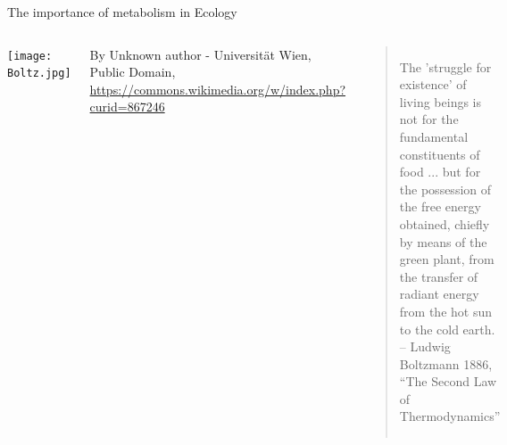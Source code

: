 \begin{frame}{The importance of metabolism in Ecology}

\begin{columns}[c]
  \centering
    \vspace*{\fill} \texttt{[image: Boltz.jpg]} 
    {\tiny By Unknown author - Universit\"{a}t Wien, Public Domain, \url{https://commons.wikimedia.org/w/index.php?curid=867246}\par}\vspace*{\fill}  
  \centering
  \vspace*{\fill} 
  \begin{quote} 
  The 'struggle for existence' of living beings is not for the fundamental constituents of food ... but for the possession of the free energy obtained, chiefly by means of the green plant, from the transfer of radiant energy from the hot sun to the cold earth. \\
  \centering
    \hfill -- {\small Ludwig Boltzmann 1886, ``The Second Law of Thermodynamics''}
\end{quote}
\vspace*{\fill}
\end{columns}

\pause

\vspace*{\fill}
\vspace*{\fill}

\end{frame}


